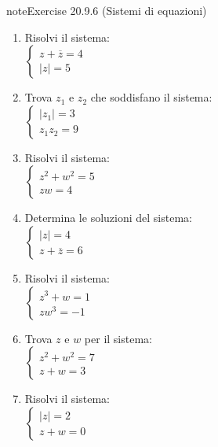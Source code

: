 \documentclass[letterpaper,10pt,italian]{jupyterBook}
\begin{document}
\begin{sphinxadmonition}{note}{Exercise 20.9.6 (Sistemi di equazioni)}


\begin{enumerate}
%
\item {} 
\sphinxAtStartPar
Risolvi il sistema:\\
\(\begin{cases} 
z + \overline{z} = 4 \\
|z| = 5 
\end{cases}\)

\item {} 
\sphinxAtStartPar
Trova \(z_1\) e \(z_2\) che soddisfano il sistema:\\
\(\begin{cases} 
|z_1| = 3 \\
z_1 z_2 = 9 
\end{cases}\)

\item {} 
\sphinxAtStartPar
Risolvi il sistema:\\
\(\begin{cases} 
z^2 + w^2 = 5 \\
z w = 4 
\end{cases}\)

\item {} 
\sphinxAtStartPar
Determina le soluzioni del sistema:\\
\(\begin{cases} 
|z| = 4 \\
z + \overline{z} = 6 
\end{cases}\)

\item {} 
\sphinxAtStartPar
Risolvi il sistema:\\
\(\begin{cases} 
z^3 + w = 1 \\
z w^3 = -1 
\end{cases}\)

\item {} 
\sphinxAtStartPar
Trova \(z\) e \(w\) per il sistema:\\
\(\begin{cases} 
z^2 + w^2 = 7 \\
z + w = 3 
\end{cases}\)

\item {} 
\sphinxAtStartPar
Risolvi il sistema:\\
\(\begin{cases} 
|z| = 2 \\
z + w = 0 
\end{cases}\)


\end{enumerate}
\end{sphinxadmonition}
\end{document}
